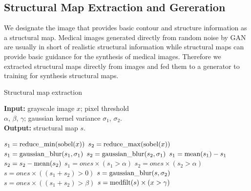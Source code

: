 \documentclass[runningheads]{llncs}
\begin{document}
	\subsection{Structural Map Extraction and Gereration}
	We designate the image that provides basic contour and structure information as a structural map. Medical images generated directly from random noise by GAN are usually in short of realistic structural information while structural maps can provide basic guidance for the synthesis of medical images. Therefore we extracted structural maps directly from images and fed them to a generator to training for synthesis structural maps.
	\vspace{-0.35cm}\begin{algorithm}[th]
		\caption{Structural map extraction}
		\label{alg:1}
	   \begin{multicols}{2}
			\hspace*{0.02in} {\bf Input: }grayscale image $x$; pixel threshold \\\hspace*{0.02in} $\alpha$, $\beta$, $\gamma$;
			gaussian kernel variance $\sigma_1$, $\sigma_2$.\\
			\hspace*{0.02in} {\bf Output: }structural map $s$.
			\begin{algorithmic}[1]
				\State $s_1 = {\rm reduce\_min}({\rm sobel}(x))$
				\State $s_2 = {\rm reduce\_max}({\rm sobel}(x))$
				\State $s_1 = {\rm gaussian\_blur}(s_1,\sigma_1)$
				\State $s_2 = {\rm gaussian\_blur}(s_2,\sigma_1)$
				\State $s_1 = {\rm mean}(s_1) - s_1$
				\State $s_2 = s_2 - {\rm mean}(s_2)$
				\State $s_1 = ones \times (s_1 > \alpha)$
				\State $s_2 = ones \times (s_2 > \alpha)$
				\State $s = ones \times ((s_1 + s_2)> 0)$
				\State $s = {\rm gaussian\_blur}(s,\sigma_2)$
				\State $s = ones \times ((s_1 + s_2)> \beta)$
				\State $s = {\rm medfilt}(s)\times (x > \gamma)$
			\end{algorithmic} 
		\end{multicols}
		\vspace{-0.3cm}
	\end{algorithm}\vspace{-0.5cm}
\end{document}

